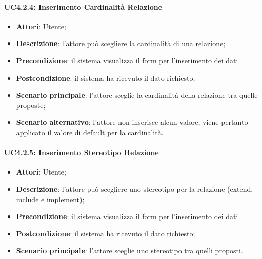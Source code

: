 \begin{itemize}
\begin{itemize}
\begin{itemize}
\begin{itemize}
\paragraph{UC4.2.4: Inserimento Cardinalità Relazione}
\label{UC4.2.4}
\begin{itemize}
	\item \textbf{Attori}: Utente;
	\item \textbf{Descrizione}: l'attore può scegliere la cardinalità di una relazione;
	\item \textbf{Precondizione}: il sistema visualizza il form per l'inserimento dei dati
	\item \textbf{Postcondizione}: il sistema ha ricevuto il dato richiesto;
	\item \textbf{Scenario principale}: l'attore sceglie la cardinalità della relazione tra quelle proposte;
	\item \textbf{Scenario alternativo}: l'attore non inserisce alcun valore, viene pertanto applicato il valore di default per la cardinalità.
\end{itemize}

\paragraph{UC4.2.5: Inserimento Stereotipo Relazione}
\label{UC4.2.5}
\begin{itemize}
	\item \textbf{Attori}: Utente;
	\item \textbf{Descrizione}: l'attore può scegliere uno stereotipo per la relazione (extend, include e implement);
	\item \textbf{Precondizione}: il sistema visualizza il form per l'inserimento dei dati
	\item \textbf{Postcondizione}: il sistema ha ricevuto il dato richiesto;
	\item \textbf{Scenario principale}: l'attore sceglie uno stereotipo tra quelli proposti.
\end{itemize}


\end{itemize}
\end{itemize}
\end{itemize}
\end{itemize}
